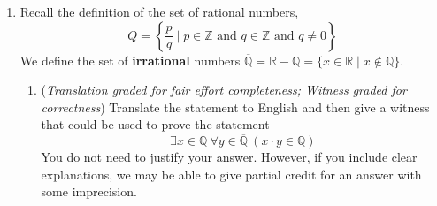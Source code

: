 \begin{enumerate}
\begin{enumerate}
        {\bf Recursive step}: Consider an arbitrary: $l' \in L$, $n \in \mathbb{N}$, and we  assume
        as the {\bf induction hypothesis} that:
        \[
            \underline{\text{BLANK~3}}
        \]
        Our goal is to show that 
        \[
            \forall m \in \mathbb{N} ~(~length(prepend(~(~(n,l')~,m)~)) = length(append(~(~(n,l'),m)~))~)
        \]
        is also true. Let $m$ be an arbitrary natural number. Calculating: 
        \[
            LHS = \underline{\text{BLANK~4}}
        \]
        \[
            RHS = \underline{\text{BLANK~5}}
        \]
        Since $LHS = RHS$, the recursive step is complete.

        \item ({\it Graded for correctness}\footnote{Graded for correctness means your solution will be
        evaluated not only on the correctness of your answers, but on your ability to 
        present your ideas clearly and logically. You should explain how you arrived at your conclusions, using 
        mathematically sound reasoning. Whether you use formal proof techniques or write a more informal argument for why 
        something is true, your answers should always be well-supported. Your goal should be to convince the reader that 
        your results and methods are sound.}) Disprove the statement 
        \[
            \forall l\in L~ \forall m \in \mathbb{N} ~(~prepend(~(l,m)~) = append(~(l,m)~)~)
        \]

        \item ({\it Graded for correctness}) Determine whether the statement
        \[
            \exists l\in L~ \exists m \in \mathbb{N} ~(~prepend(~(l,m)~) = append(~(l,m)~)~)
        \]
        is true or false, and justify your conclusion using valid proof strategies.
    \end{enumerate}

    \item Recall the definition of the set of rational numbers,
    $$Q = \left\{ \frac{p}{q} \mid p \in \mathbb{Z}  \text{ and  } q  \in \mathbb{Z} \text{ and } q \neq  0 \right\}$$
    We define the set of {\bf irrational} numbers $\overline{\mathbb{Q}} = \mathbb{R} - \mathbb{Q}
    = \{ x \in \mathbb{R} \mid x \notin \mathbb{Q} \}$. 

    \begin{enumerate}
        \item ({\it Translation graded for fair effort completeness; Witness graded 
        for correctness}) Translate the statement to English and then give a witness 
        that could be used to prove the statement 
        \[
        \exists x \in \mathbb{Q}~ \forall y \in \overline{\mathbb{Q}} ~(x\cdot y \in \mathbb{Q})
        \]
        You do not need to justify your answer.  However, if you include clear explanations, 
        we may be able to give partial credit for an answer with some imprecision.
   

\end{enumerate}
\end{enumerate}
